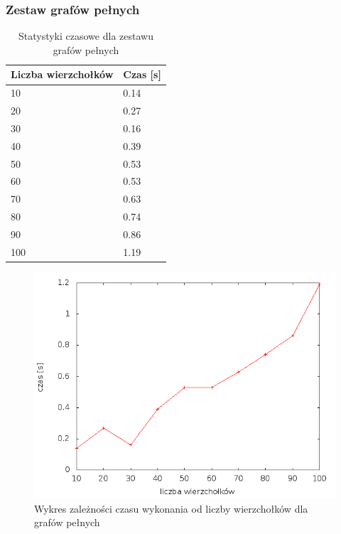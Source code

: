 \documentclass[12pt, a4paper]{article}
\begin{document}
\subsubsection*{Zestaw grafów pełnych}
\begin{table}[H]
\caption{Statystyki czasowe dla zestawu grafów pełnych}
\begin{center}
    \begin{tabular}{|l|l|}
    \hline
    Liczba wierzchołków & Czas [s] \\ \hline
    10 & 0.14 \\ \hline
    20 & 0.27 \\ \hline
    30 & 0.16 \\ \hline
    40 & 0.39 \\ \hline
    50 & 0.53 \\ \hline
    60 & 0.53 \\ \hline
    70 & 0.63 \\ \hline
    80 & 0.74 \\ \hline
    90 & 0.86 \\ \hline
    100 & 1.19 \\ \hline
    \end{tabular}
\end{center}
\end{table}

\begin{figure}[h]
    \begin{center}
	\includegraphics[scale=0.5]{../experiment_1/img/den/den_1.png}
	\caption{Wykres zależności czasu wykonania od liczby wierzchołków dla grafów pełnych}
    \end{center}
\end{figure}
\newpage
\end{document}
